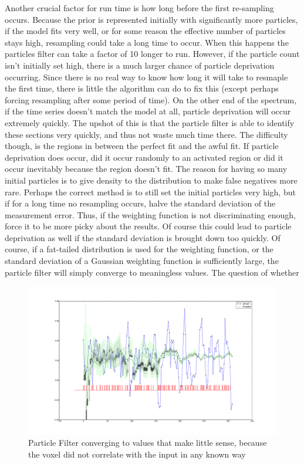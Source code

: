 Another crucial factor for run time is how long before the first re-sampling 
occurs. Because the prior is represented initially with significantly more
particles, if the model fits very well, or for some reason the effective
number of particles stays high, resampling could take a long time to occur.
When this happens the particles filter can take a factor of 10 longer to run.
However, if the particle count isn't initially set high, there is a much larger
chance of particle deprivation occurring. Since there is no real way to know
how long it will take to resmaple the first time, there is little the 
algorithm can do to fix this (except perhaps forcing resampling after
some period of time). On the other end of the spectrum, if the time
series doesn't match the model at all, particle deprivation will occur extremely
quickly.  The upshot of this is that the particle filter is able to 
identify these sections very quickly, and thus not waste much time there.
The difficulty though, is the regions in between the perfect fit and the
awful fit. If particle deprivation does occur, did it occur randomly to an
activated region or did it occur inevitably because the region doesn't fit.
The reason for having so many initial particles is to give density to the
distribution to make false negatives more rare. Perhaps the correct method
is to still set the initial particles very high, but if for a long time no
resampling occurs, halve the standard deviation of the measurement error.
Thus, if the weighting function is not discriminating enough, force it 
to be more picky about the results. Of course this could lead to particle
deprivation as well if the standard deviation is brought down too quickly.
Of course, if a fat-tailed distribution is used for the weighting function,
or the standard deviation of a Gaussian weighting function is sufficiently large,
the particle filter will simply converge to meaningless values. The question
of whether 

\begin{figure}
\includegraphics[clip=true,trim=10cm 4cm 10cm 4cm, width=16cm]{images/inactive_illogical}
\caption{Particle Filter converging to values that make little sense,
because the voxel did not correlate with the input in any known way}
\label{fig:badfit}
\end{figure}


